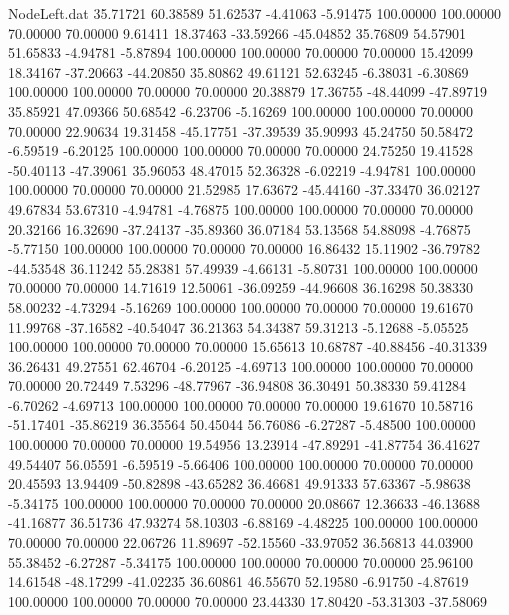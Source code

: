 \begin{filecontents}{NodeLeft.dat}
  35.71721   60.38589   51.62537    -4.41063   -5.91475  100.00000  100.00000   70.00000   70.00000    9.61411   18.37463  -33.59266  -45.04852
  35.76809   54.57901   51.65833    -4.94781   -5.87894  100.00000  100.00000   70.00000   70.00000   15.42099   18.34167  -37.20663  -44.20850
  35.80862   49.61121   52.63245    -6.38031   -6.30869  100.00000  100.00000   70.00000   70.00000   20.38879   17.36755  -48.44099  -47.89719
  35.85921   47.09366   50.68542    -6.23706   -5.16269  100.00000  100.00000   70.00000   70.00000   22.90634   19.31458  -45.17751  -37.39539
  35.90993   45.24750   50.58472    -6.59519   -6.20125  100.00000  100.00000   70.00000   70.00000   24.75250   19.41528  -50.40113  -47.39061
  35.96053   48.47015   52.36328    -6.02219   -4.94781  100.00000  100.00000   70.00000   70.00000   21.52985   17.63672  -45.44160  -37.33470
  36.02127   49.67834   53.67310    -4.94781   -4.76875  100.00000  100.00000   70.00000   70.00000   20.32166   16.32690  -37.24137  -35.89360
  36.07184   53.13568   54.88098    -4.76875   -5.77150  100.00000  100.00000   70.00000   70.00000   16.86432   15.11902  -36.79782  -44.53548
  36.11242   55.28381   57.49939    -4.66131   -5.80731  100.00000  100.00000   70.00000   70.00000   14.71619   12.50061  -36.09259  -44.96608
  36.16298   50.38330   58.00232    -4.73294   -5.16269  100.00000  100.00000   70.00000   70.00000   19.61670   11.99768  -37.16582  -40.54047
  36.21363   54.34387   59.31213    -5.12688   -5.05525  100.00000  100.00000   70.00000   70.00000   15.65613   10.68787  -40.88456  -40.31339
  36.26431   49.27551   62.46704    -6.20125   -4.69713  100.00000  100.00000   70.00000   70.00000   20.72449    7.53296  -48.77967  -36.94808
  36.30491   50.38330   59.41284    -6.70262   -4.69713  100.00000  100.00000   70.00000   70.00000   19.61670   10.58716  -51.17401  -35.86219
  36.35564   50.45044   56.76086    -6.27287   -5.48500  100.00000  100.00000   70.00000   70.00000   19.54956   13.23914  -47.89291  -41.87754
  36.41627   49.54407   56.05591    -6.59519   -5.66406  100.00000  100.00000   70.00000   70.00000   20.45593   13.94409  -50.82898  -43.65282
  36.46681   49.91333   57.63367    -5.98638   -5.34175  100.00000  100.00000   70.00000   70.00000   20.08667   12.36633  -46.13688  -41.16877
  36.51736   47.93274   58.10303    -6.88169   -4.48225  100.00000  100.00000   70.00000   70.00000   22.06726   11.89697  -52.15560  -33.97052
  36.56813   44.03900   55.38452    -6.27287   -5.34175  100.00000  100.00000   70.00000   70.00000   25.96100   14.61548  -48.17299  -41.02235
  36.60861   46.55670   52.19580    -6.91750   -4.87619  100.00000  100.00000   70.00000   70.00000   23.44330   17.80420  -53.31303  -37.58069

\end{filecontents}
